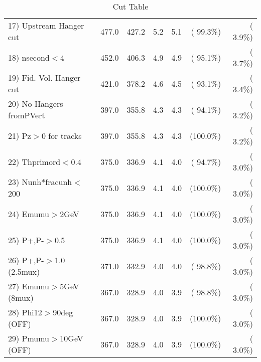 \begin{table}[h!]
\begin{tabular}{||l||r|r|r|r|r|r||}
 17) Upstream Hanger cut  &        477.0 &        427.2 &          5.2 &          5.1 & ( 99.3\%) & (  3.9\%) \\
 18) nsecond$<$4          &        452.0 &        406.3 &          4.9 &          4.9 & ( 95.1\%) & (  3.7\%) \\
 19) Fid. Vol. Hanger cut &        421.0 &        378.2 &          4.6 &          4.5 & ( 93.1\%) & (  3.4\%) \\
 20) No Hangers fromPVert &        397.0 &        355.8 &          4.3 &          4.3 & ( 94.1\%) & (  3.2\%) \\
 21) Pz$>$0 for tracks    &        397.0 &        355.8 &          4.3 &          4.3 & (100.0\%) & (  3.2\%) \\
 22) Thprimord$<$0.4      &        375.0 &        336.9 &          4.1 &          4.0 & ( 94.7\%) & (  3.0\%) \\
 23) Nunh*fracunh$<$200   &        375.0 &        336.9 &          4.1 &          4.0 & (100.0\%) & (  3.0\%) \\
 24) Emumu$>$2GeV         &        375.0 &        336.9 &          4.1 &          4.0 & (100.0\%) & (  3.0\%) \\
 25) P+,P-$>$0.5          &        375.0 &        336.9 &          4.1 &          4.0 & (100.0\%) & (  3.0\%) \\
 26) P+,P-$>$1.0 (2.5mux) &        371.0 &        332.9 &          4.0 &          4.0 & ( 98.8\%) & (  3.0\%) \\
 27) Emumu$>$5GeV  (8mux) &        367.0 &        328.9 &          4.0 &          3.9 & ( 98.8\%) & (  3.0\%) \\
 28) Phi12$>$90deg  (OFF) &        367.0 &        328.9 &          4.0 &          3.9 & (100.0\%) & (  3.0\%) \\
 29) Pmumu$>$10GeV  (OFF) &        367.0 &        328.9 &          4.0 &          3.9 & (100.0\%) & (  3.0\%) \\
 \hline
 \hline
 \end{tabular}
 \caption{Cut Table           }
 \label{tab-cutcohjpsi-mumu_cohpip}
 \end{table}
